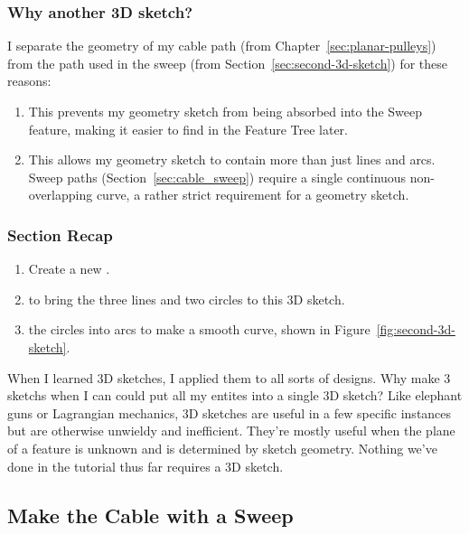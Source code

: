 \subsubsection{Why another 3D sketch?}

I separate the geometry of my cable path (from Chapter~\ref{sec:planar-pulleys})
from the path used in the sweep (from Section~\ref{sec:second-3d-sketch}) for
these reasons:

\begin{enumerate}
\item{} This prevents my geometry sketch from being absorbed into the Sweep feature,
making it easier to find in the Feature Tree later.
\item{} This allows my geometry sketch to contain more than just lines and arcs.
Sweep paths (Section~\ref{sec:cable_sweep}) require a single continuous
non-overlapping curve, a rather strict requirement for a geometry sketch.
\end{enumerate}

\subsubsection{Section Recap}

\begin{enumerate}
\item{} Create a new .
\item{}  to bring the three lines and two circles to this 3D
sketch.
\item{}  the circles into arcs to make a smooth curve, shown in Figure~\ref{fig:second-3d-sketch}.
\end{enumerate}

\begin{aside}
\label{aside:3d_sketch_warning}

When I learned 3D sketches, I applied them to all sorts of designs. Why make 3
sketchs when I can could put all my entites into a single 3D sketch? Like
elephant guns or Lagrangian mechanics, 3D sketches are useful in a few specific
instances but are otherwise unwieldy and
inefficient. They're mostly useful when the plane of a feature is unknown and is
determined by sketch geometry. Nothing we've done in the tutorial thus far
requires a 3D sketch.

\end{aside}

\subsection{Make the Cable with a Sweep}

